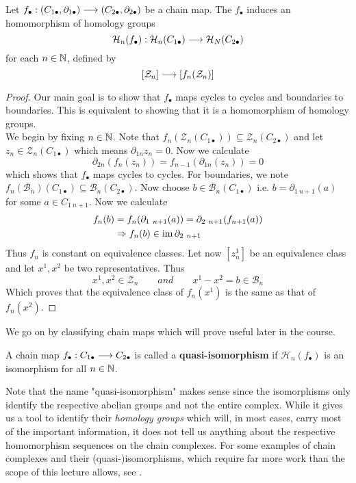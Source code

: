 \begin{lem}
  Let $f_\bullet :(C_{1\bullet}, \partial_{1\bullet}) \longrightarrow (C_{2\bullet}, \partial_{2\bullet})$ be a chain map. The $f_\bullet$ induces an homomorphism of homology groups
  $$ \mathcal{H}_n (f_\bullet): \mathcal{H}_n(C_{1\bullet}) \longrightarrow \mathcal{H}_N (C_{2\bullet})  $$
  for each $n \in \mathbb{N}$, defined by
  $$ [\mathcal{Z}_n] \longrightarrow [f_n(\mathcal{Z}_n)] $$
\begin{proof}
  Our main goal is to show that $f_\bullet$ maps cycles to cycles and boundaries to boundaries. This is equivalent to showing that it is a homomorphism of homology groups.\\

  We begin by fixing $n\in \mathbb{N}$. Note that $f_n(\mathcal{Z}_n(C_{1\bullet})) \subseteq \mathcal{Z}_n(C_{2\bullet}) $ and let $z_n \in \mathcal{Z}_n(C_{1\bullet})$ which means $\partial_{1n}z_n = 0$. Now we calculate
  $$ \partial_{2n}(f_n(z_n)) = f_{n-1}(\partial_{1n}(z_n)) = 0 $$
  which shows that $f_\bullet$ maps cycles to cycles. For boundaries, we note $f_n(\mathcal{B}_n)(C_{1\bullet}) \subseteq \mathcal{B}_n(C_{2\bullet})$. Now choose $b\in \mathcal{B}_n(C_{1\bullet})$ i.e. $b = \partial_{1 \ n+1}(a)$ for some $a \in C_{1 \ n+1}$. Now we calculate
  \begin{align}
    f_n(b) &= f_n(\partial_{1 \ n+1}(a)) = \partial_{2 \ n+1}(f_{n+1}(a))\\
    &\Rightarrow f_n(b) \in \im \partial_{2 \ n+1}
  \end{align}
  Thus $f_n$ is constant on equivalence classes. Let now $[z^1_n]$ be an equivalence class and let $x^1, x^2$ be two representatives. Thus
  $$ x^1, x^2 \in \mathcal{Z}_n \quad \quad and \quad \quad x^1-x^2 = b  \in \mathcal{B}_n$$
  Which proves that the equivalence class of $f_n(x^1)$ is the same as that of $f_n(x^2)$.
\end{proof}
\end{lem}


We go on by classifying chain maps which will prove useful later in the course.

\begin{definition}
  A chain map $f_\bullet : C_{1\bullet} \longrightarrow C_{2\bullet}$ is called a \textbf{quasi-isomorphism} if $\mathcal{H}_n(f_\bullet)$ is an isomorphism for all $n \in \mathbb{N}$.
\end{definition}

Note that the name "quasi-isomorphism" makes sense since the isomorphisms only identify the respective abelian groups and not the entire complex. While it gives us a tool to identify their \emph{homology groups} which will, in most cases, carry most of the important information, it does not tell us anything about the respective homomorphism sequences on the chain complexes. For some examples of chain complexes and their (quasi-)isomorphisms, which require far more work than the scope of this lecture allows, see .

